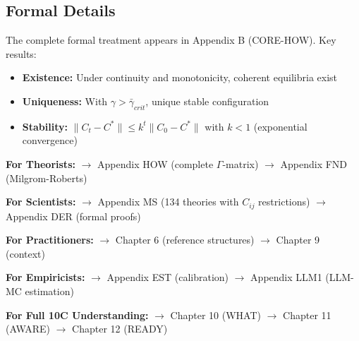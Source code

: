 \subsection{Formal Details}
\label{sec:comp-formal}

The complete formal treatment appears in Appendix B (CORE-HOW). Key results:
\begin{itemize}[nosep]
    \item \textbf{Existence:} Under continuity and monotonicity, coherent equilibria exist
    \item \textbf{Uniqueness:} With $\gamma > \bar{\gamma}_{crit}$, unique stable configuration
    \item \textbf{Stability:} $\|C_t - C^*\| \leq k^t \|C_0 - C^*\|$ with $k < 1$ (exponential convergence)
\end{itemize}

\begin{tcolorbox}[
    colback=gray!10!white,
    colframe=gray!75!black,
    title={\textbf{Reading Paths from Chapter 5}}
]
\textbf{For Theorists:}
$\rightarrow$ Appendix HOW (complete $\Gamma$-matrix) $\rightarrow$ Appendix FND (Milgrom-Roberts)

\textbf{For Scientists:}
$\rightarrow$ Appendix MS (134 theories with $C_{ij}$ restrictions) $\rightarrow$ Appendix DER (formal proofs)

\textbf{For Practitioners:}
$\rightarrow$ Chapter 6 (reference structures) $\rightarrow$ Chapter 9 (context)

\textbf{For Empiricists:}
$\rightarrow$ Appendix EST (calibration) $\rightarrow$ Appendix LLM1 (LLM-MC estimation)

\textbf{For Full 10C Understanding:}
$\rightarrow$ Chapter 10 (WHAT) $\rightarrow$ Chapter 11 (AWARE) $\rightarrow$ Chapter 12 (READY)
\end{tcolorbox}

